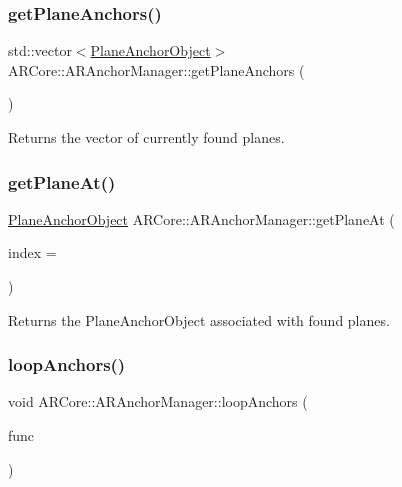 \subsubsection{\texorpdfstring{get\+Plane\+Anchors()}{getPlaneAnchors()}}
{\footnotesize\ttfamily std\+::vector$<$\hyperlink{struct_a_r_objects_1_1_plane_anchor_object}{Plane\+Anchor\+Object}$>$ A\+R\+Core\+::\+A\+R\+Anchor\+Manager\+::get\+Plane\+Anchors (\begin{DoxyParamCaption}{ }\end{DoxyParamCaption})\hspace{0.3cm}{\ttfamily [inline]}}



Returns the vector of currently found planes. 

\mbox{\label{class_a_r_core_1_1_a_r_anchor_manager_ac885fded5a2a2f5c0b58506786e069f1}} 
\subsubsection{\texorpdfstring{get\+Plane\+At()}{getPlaneAt()}}
{\footnotesize\ttfamily \hyperlink{struct_a_r_objects_1_1_plane_anchor_object}{Plane\+Anchor\+Object} A\+R\+Core\+::\+A\+R\+Anchor\+Manager\+::get\+Plane\+At (\begin{DoxyParamCaption}\item[{int}]{index = {} }\end{DoxyParamCaption})}



Returns the Plane\+Anchor\+Object associated with found planes. 

\mbox{\label{class_a_r_core_1_1_a_r_anchor_manager_a687246a5f0aacaac63053c0e05081e11}} 
\subsubsection{\texorpdfstring{loop\+Anchors()}{loopAnchors()}\hspace{0.1cm}{\footnotesize\ttfamily [1/2]}}
{\footnotesize\ttfamily void A\+R\+Core\+::\+A\+R\+Anchor\+Manager\+::loop\+Anchors (\begin{DoxyParamCaption}\item[{std\+::function$<$ void(\hyperlink{struct_a_r_objects_1_1_a_r_object}{A\+R\+Object})$>$}]{func }\end{DoxyParamCaption})}

